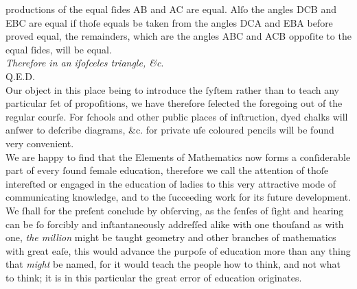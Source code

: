 \newpage

\begin{minipage}{0.20\textwidth}
    \phantom{}
\end{minipage}%
\begin{minipage}{0.80\textwidth}
    productions of the equal ſides AB and AC are equal.  Alſo the angles DCB and EBC are equal if thoſe equals be taken from the angles DCA and EBA before proved equal, the remainders, which are the angles ABC and ACB oppoſite to the equal ſides, will be equal.\\

    \textit{Therefore in an iſoſceles triangle, \&c}.\\

    \hfill Q.E.D.\\

    Our object in this place being to introduce the ſyſtem rather than to teach any particular ſet of propoſitions, we have therefore ſelected the foregoing out of the regular courſe. For ſchools and other public places of inſtruction, dyed chalks will anſwer to deſcribe diagrams, \&c. for private uſe coloured pencils will be found very convenient.\\

    We are happy to find that the Elements of Mathematics now forms a conſiderable part of every ſound female education, therefore we call the attention of thoſe intereſted or engaged in the education of ladies to this very attractive mode of communicating knowledge, and to the ſucceeding work for its future development.\\

    We ſhall for the preſent conclude by obſerving, as the ſenſes of ſight and hearing can be ſo forcibly and inſtantaneously addreſſed alike with one thouſand as with one, \textit{the million} might be taught geometry and other branches of mathematics with great eaſe, this would advance the purpoſe of education more than any thing that \textit{might} be named, for it would teach the people how to think, and not what to think; it is in this particular the great error of education originates.
\end{minipage}
